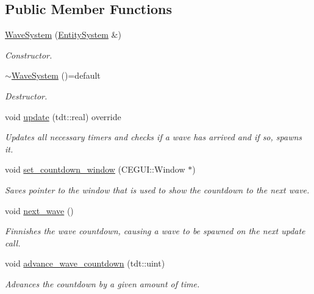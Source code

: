 \subsection*{Public Member Functions}
\begin{DoxyCompactItemize}
\item 
\hyperlink{class_wave_system_a29290eac1f7d107ca891e9ee08192630}{Wave\+System} (\hyperlink{class_entity_system}{Entity\+System} \&)
\begin{DoxyCompactList}\small\item\em Constructor. \end{DoxyCompactList}\item 
\hyperlink{class_wave_system_aef0ccfc8165a323ef94c38e707de7eb2}{$\sim$\+Wave\+System} ()=default
\begin{DoxyCompactList}\small\item\em Destructor. \end{DoxyCompactList}\item 
void \hyperlink{class_wave_system_a98df4388628f2618db5c2aa18ce67c11}{update} (tdt\+::real) override
\begin{DoxyCompactList}\small\item\em Updates all necessary timers and checks if a wave has arrived and if so, spawns it. \end{DoxyCompactList}\item 
void \hyperlink{class_wave_system_ae145f693f33074fb68273d23bb9fd36c}{set\+\_\+countdown\+\_\+window} (C\+E\+G\+U\+I\+::\+Window $\ast$)
\begin{DoxyCompactList}\small\item\em Saves pointer to the window that is used to show the countdown to the next wave. \end{DoxyCompactList}\item 
void \hyperlink{class_wave_system_a8ac386c12cc0458e7faf05dcc96da02b}{next\+\_\+wave} ()
\begin{DoxyCompactList}\small\item\em Finnishes the wave countdown, causing a wave to be spawned on the next update call. \end{DoxyCompactList}\item 
void \hyperlink{class_wave_system_aab24fdbbbfb06ac094a5cc54d221a9fd}{advance\+\_\+wave\+\_\+countdown} (tdt\+::uint)
\begin{DoxyCompactList}\small\item\em Advances the countdown by a given amount of time. \end{DoxyCompactList}\item 

\end{DoxyCompactItemize}
